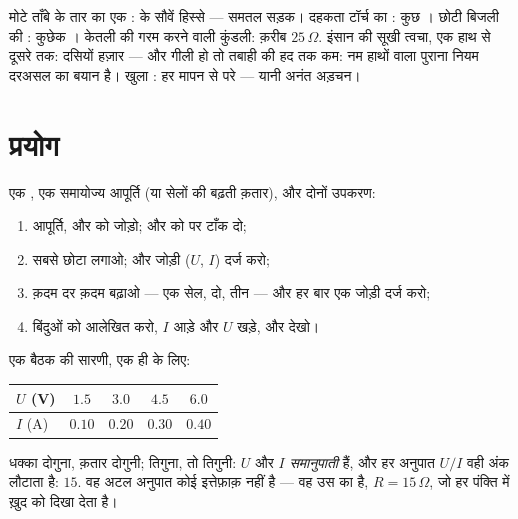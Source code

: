 \begin{example}[तुम्हारे आस-पास के प्रतिरोध]\label{ex:g8:ohms-law:values}
मोटे ताँबे के तार का एक :  के सौवें हिस्से --- समतल सड़क।
दहकता टॉर्च का : कुछ । छोटी बिजली की : कुछेक । केतली की
गरम करने वाली कुंडली: क़रीब $25\,\Omega$. इंसान की सूखी त्वचा, एक हाथ
से दूसरे तक: दसियों हज़ार  --- और गीली हो तो तबाही की हद तक कम: नम
हाथों वाला पुराना नियम दरअसल  का बयान है। खुला : हर मापन
से परे  --- यानी अनंत अड़चन।
\end{example}

\section{प्रयोग}

\begin{method}[किसी पुरज़े का $U$--$I$ चित्र लेना]\label{met:g8:ohms-law:portrait}
एक , एक समायोज्य आपूर्ति (या सेलों की बढ़ती क़तार), और दोनों
उपकरण:
\begin{enumerate}
  \item आपूर्ति,  और  को  जोड़ो; और
         को  पर टाँक दो;
  \item सबसे छोटा  लगाओ; और जोड़ी ($U$, $I$) दर्ज करो;
  \item {} क़दम दर क़दम बढ़ाओ --- एक सेल, दो, तीन --- और हर बार
        एक जोड़ी दर्ज करो;
  \item बिंदुओं को आलेखित करो, $I$ आड़े और $U$ खड़े, और देखो।
\end{enumerate}
\end{method}

\begin{example}[प्रतिरोधक का इक़बाल]\label{ex:g8:ohms-law:confession}
एक बैठक की सारणी, एक ही  के लिए:
\begin{center}
\begin{tabular}{l|cccc}
$U$ (\unit{V}) & $1.5$ & $3.0$ & $4.5$ & $6.0$ \\
\hline
$I$ (\unit{A}) & $0.10$ & $0.20$ & $0.30$ & $0.40$
\end{tabular}
\end{center}
धक्का दोगुना, क़तार दोगुनी; तिगुना, तो तिगुनी: $U$ और $I$
\emph{समानुपाती} हैं, और हर अनुपात $U/I$ वही अंक लौटाता है: $15$. वह
अटल अनुपात कोई इत्तेफ़ाक़ नहीं है --- वह उस  का  है,
$R = 15\,\Omega$, जो हर पंक्ति में ख़ुद को दिखा देता है।
\end{example}

